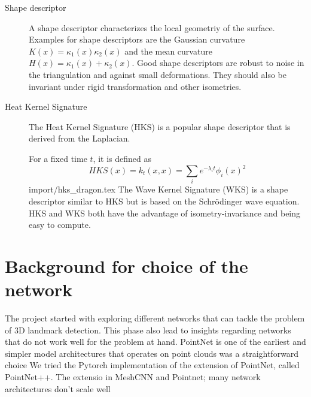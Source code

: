 \documentclass[class=article, crop=false]{standalone}
\begin{document}
\begin{description}
    \item[Shape descriptor] A shape descriptor characterizes the local geometriy of the surface. Examples for shape descriptors are the Gaussian curvature $K(x) = \kappa_1(x)\kappa_2(x)$ and the mean curvature $H(x) = \kappa_1(x)+\kappa_2(x)$. Good shape descriptors are robust to noise in the triangulation and against small deformations. They should also be invariant under rigid transformation and other isometries. \cite{stanfod_iso}
    
    \item[Heat Kernel Signature] The Heat Kernel Signature (HKS) is a popular shape descriptor that is derived from the Laplacian. 
    
    For a fixed time $t$, it is defined as 
    \begin{equation}
        HKS(x) = k_t(x,x) = \sum_{i} e^{-\lambda_i t}\phi_i(x)^2
    \end{equation}
    {import/hks_dragon.tex}
    The Wave Kernel Signature (WKS) is a shape descriptor similar to HKS but is based on the Schrödinger wave equation. HKS and WKS both have the advantage of isometry-invariance and being easy to compute.

    
\end{description}


\section{Background for choice of the network}
\label{sec:app2}
The project started with exploring different networks that can tackle the problem of 3D landmark detection. This phase also lead to insights regarding networks that do not work well for the problem at hand. PointNet is one of the earliest and simpler model architectures that operates on point clouds was a straightforward choice  We tried the Pytorch implementation of the extension of PointNet, called PointNet++. The extensio in MeshCNN and Pointnet; many network architectures don't scale well

\end{document}
